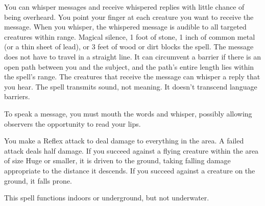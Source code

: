 \spellrng{\rngmed}
\spelldur{\durlong}
\begin{spelleffect}
  You can whisper messages and receive whispered replies with little chance of being overheard. You point your finger at each creature you want to receive the message. When you whisper, the whispered message is audible to all targeted creatures within range. Magical silence, 1 foot of stone, 1 inch of common metal (or a thin sheet of lead), or 3 feet of wood or dirt blocks the spell. The message does not have to travel in a straight line. It can circumvent a barrier if there is an open path between you and the subject, and the path's entire length lies within the spell's range. The creatures that receive the message can whisper a reply that you hear. The spell transmits sound, not meaning. It doesn't transcend language barriers.
\end{spelleffect}
\begin{spellnotes}
  To speak a message, you must mouth the words and whisper, possibly allowing observers the opportunity to read your lips.
\end{spellnotes}

\spellrng{\rngfar}
\begin{spelleffect}
    You make a Reflex attack to deal damage to everything in the area. A failed attack deals half damage. If you succeed against a flying creature within the area of size Huge or smaller, it is driven to the ground, taking falling damage appropriate to the distance it descends. If you succeed against a creature on the ground, it falls prone.
\end{spelleffect}
\begin{spellnotes}
  This spell functions indoors or underground, but not underwater.
\end{spellnotes}

